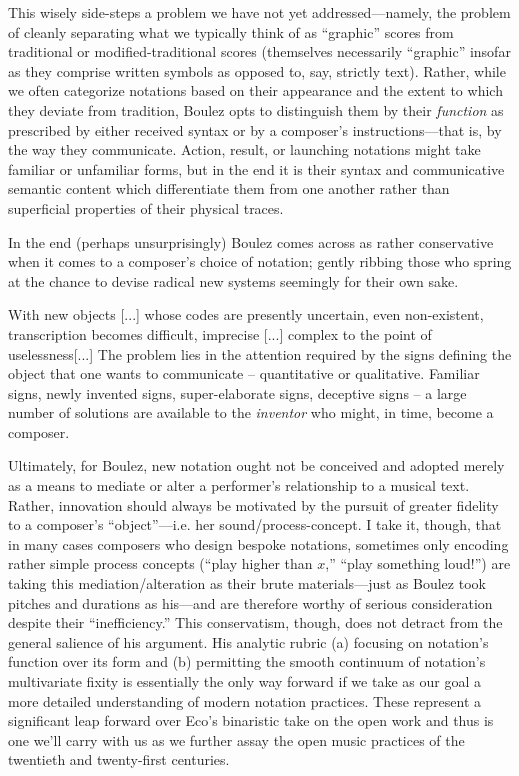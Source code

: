     This wisely side-steps a problem we have not yet addressed---namely, the problem of cleanly separating what we typically think of as ``graphic'' scores from traditional or modified-traditional scores (themselves necessarily ``graphic''  insofar as they comprise written symbols as opposed to, say, strictly text). Rather, while we often categorize notations based on their appearance and the extent to which they deviate from tradition, Boulez opts to distinguish them by their \textit{function} as prescribed by either received syntax or by a composer's instructions---that is, by the way they communicate. Action, result, or launching notations might take familiar or unfamiliar forms, but in the end it is their syntax and communicative semantic content which differentiate them from one another rather than superficial properties of their physical traces.

    In the end (perhaps unsurprisingly) Boulez comes across as rather conservative when it comes to a composer's choice of notation; gently ribbing those who spring at the chance to devise radical new systems seemingly for their own sake.

    \begin{smallquote}
        With new objects [...] whose codes are presently uncertain, even non-existent, transcription becomes difficult, imprecise [...] complex to the point of uselessness[...] The problem lies in the attention required by the signs defining the object that one wants to communicate -- quantitative or qualitative. Familiar signs, newly invented signs, super-elaborate signs, deceptive signs -- a large number of solutions are available to the \textit{inventor} who might, in time, become a composer.\autocite[532]{Boulez_Nattiez_2019}
    \end{smallquote}

    \noindent Ultimately, for Boulez, new notation ought not be conceived and adopted merely as a means to mediate or alter a performer's relationship to a musical text. Rather, innovation should always be motivated by the pursuit of greater fidelity to a composer's ``object''---i.e. her sound/process-concept. I take it, though, that in many cases composers who design bespoke notations, sometimes only encoding rather simple process concepts (``play higher than $x$,'' ``play something loud!'') are taking this mediation/alteration as their brute materials---just as Boulez took pitches and durations as his---and are therefore worthy of serious consideration despite their ``inefficiency.'' This conservatism, though, does not detract from the general salience of his argument. His analytic rubric (a) focusing on notation's function over its form and (b) permitting the smooth continuum of notation's multivariate fixity is essentially the only way forward if we take as our goal a more detailed understanding of modern notation practices. These represent a significant leap forward over Eco's binaristic take on the open work and thus is one we'll carry with us as we further assay the open music practices of the twentieth and twenty-first centuries. 



